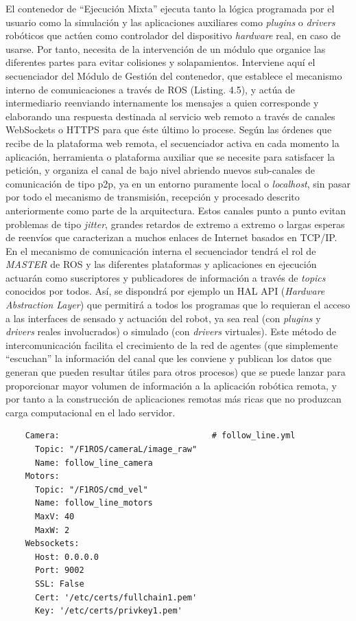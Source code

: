 El contenedor de ``Ejecución Mixta'' ejecuta tanto la lógica programada por el usuario como la simulación y las aplicaciones auxiliares como \textit{plugins} o \textit{drivers} robóticos que actúen como controlador del dispositivo \textit{hardware} real, en caso de usarse. Por tanto, necesita de la intervención de un módulo que organice las diferentes partes para evitar colisiones y solapamientos. Interviene aquí el secuenciador del Módulo de Gestión del contenedor, que establece el mecanismo interno de comunicaciones a través de ROS (Listing. 4.5), y actúa de intermediario reenviando internamente los mensajes a quien corresponde y elaborando una respuesta destinada al servicio web remoto a través de canales WebSockets o HTTPS para que éste último lo procese. Según las órdenes que recibe de la plataforma web remota, el secuenciador activa en cada momento la aplicación, herramienta o plataforma auxiliar que se necesite para satisfacer la petición, y organiza el canal de bajo nivel abriendo nuevos sub-canales de comunicación de tipo p2p, ya en un entorno puramente local o \textit{localhost}, sin pasar por todo el mecanismo de transmisión, recepción y procesado descrito anteriormente como parte de la arquitectura. Estos canales punto a punto evitan problemas de tipo \textit{jitter}, grandes retardos de extremo a extremo o largas esperas de reenvíos que caracterizan a muchos enlaces de Internet basados en TCP/IP. En el mecanismo de comunicación interna el secuenciador tendrá el rol de \textit{MASTER} de ROS y las diferentes plataformas y aplicaciones en ejecución actuarán como suscriptores y publicadores de información a través de \textit{topics} conocidos por todos. Así, se dispondrá por ejemplo un HAL API (\textit{Hardware Abstraction Layer}) que permitirá a todos los programas que lo requieran el acceso a las interfaces de sensado y actuación del robot, ya sea real (con \textit{plugins} y \textit{drivers} reales involucrados) o simulado (con \textit{drivers} virtuales). Este método de intercomunicación facilita el crecimiento de la red de agentes (que simplemente ``escuchan'' la información del canal que les conviene y publican los datos que generan que pueden resultar útiles para otros procesos) que se puede lanzar para proporcionar mayor volumen de información a la aplicación robótica remota, y por tanto a la construcción de aplicaciones remotas más ricas que no produzcan carga computacional en el lado servidor.
\begin{verbatim}
    Camera:                               # follow_line.yml
      Topic: "/F1ROS/cameraL/image_raw" 
      Name: follow_line_camera
    Motors:
      Topic: "/F1ROS/cmd_vel"
      Name: follow_line_motors
      MaxV: 40
      MaxW: 2
    Websockets:
      Host: 0.0.0.0 
      Port: 9002
      SSL: False
      Cert: '/etc/certs/fullchain1.pem' 
      Key: '/etc/certs/privkey1.pem'
\end{verbatim}
\begin{lstlisting}[caption=Configuración de Canales Internos del Secuenciador en formato YAML]
\end{lstlisting}

